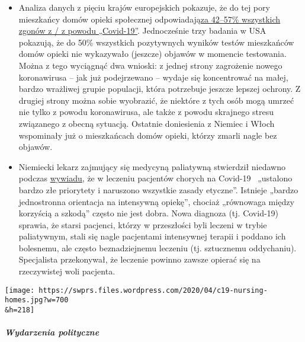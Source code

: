 \begin{itemize}
\tightlist
\item
  Analiza danych z pięciu krajów europejskich pokazuje, że do tej pory
  mieszkańcy domów opieki społecznej
  odpowiadają\href{https://ltccovid.org/2020/04/12/mortality-associated-with-covid-19-outbreaks-in-care-homes-early-international-evidence/}{za
  42--57\% wszystkich zgonów z / z powodu „Covid-19''}. Jednocześnie
  trzy badania w USA pokazują, że do 50\% wszystkich pozytywnych wyników
  testów mieszkańców domów opieki nie wykazywało (jeszcze) objawów w
  momencie testowania. Można z tego wyciągnąć dwa wnioski: z jednej
  strony zagrożenie nowego koronawirusa -- jak już podejrzewano --
  wydaje się koncentrować na małej, bardzo wrażliwej grupie populacji,
  która potrzebuje jeszcze lepszej ochrony. Z drugiej strony można sobie
  wyobrazić, że niektóre z tych osób mogą umrzeć nie tylko z powodu
  koronawirusa, ale także z powodu skrajnego stresu związanego z obecną
  sytuacją. Ostatnie doniesienia z Niemiec i Włoch wspominały już o
  mieszkańcach domów opieki, którzy zmarli nagle bez objawów.
\item
  Niemiecki lekarz zajmujący się medycyną paliatywną stwierdził niedawno
  podczas
  \href{https://www.deutschlandfunk.de/palliativmediziner-zu-covid-19-behandlungen-sehr-falsche.694.de.html?dram:article_id=474488}{wywiadu},
  że w leczeniu pacjentów chorych na Covid-19~ „ustalono bardzo złe
  priorytety i naruszono wszystkie zasady etyczne''. Istnieje „bardzo
  jednostronna orientacja na intensywną opiekę'', chociaż „równowaga
  między korzyścią a szkodą'' często nie jest dobra. Nowa diagnoza (tj.
  Covid-19) sprawia, że starsi pacjenci, którzy w przeszłości byli
  leczeni w trybie paliatywnym, stali się nagle pacjentami intensywnej
  terapii i poddano ich bolesnemu, ale często beznadziejnemu leczeniu
  (tj. sztucznemu oddychaniu). Specjalista przekonywał, że leczenie
  powinno zawsze opierać się na rzeczywistej woli pacjenta.
\end{itemize}

\texttt{[image: https://swprs.files.wordpress.com/2020/04/c19-nursing-homes.jpg?w=700\\\&h=218]}

\hypertarget{wydarzenia-polityczne-3}{%
\subparagraph{\texorpdfstring{\textbf{Wydarzenia
polityczne}}{Wydarzenia polityczne}}\label{wydarzenia-polityczne-3}}

